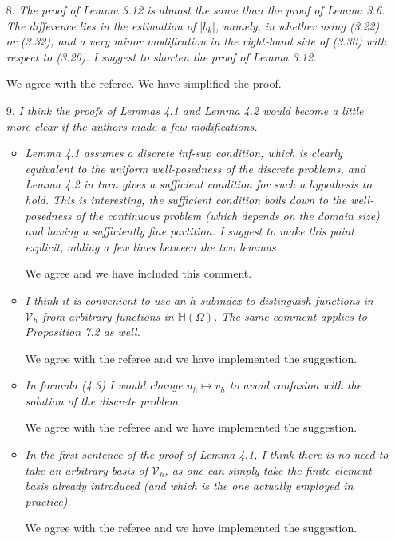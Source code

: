\documentclass[11 pt]{article}
\numberwithin{equation}{section}
\begin{document}
\begin{enumerate}
    \item[8.] \emph{The proof of Lemma 3.12 is almost the same than the proof of Lemma 3.6. The difference lies in the estimation of \(|b_{k}|\), namely, in whether using (3.22) or (3.32), and a very minor modification in the right-hand side of (3.30) with respect to (3.20). I suggest to shorten the proof of Lemma 3.12.}

 We agree with the referee. We have simplified the proof.

    \item[9.] \emph{I think the proofs of Lemmas 4.1 and Lemma 4.2 would become a little more clear if the authors made a few modifications.}
    \begin{itemize}
        \item \emph{Lemma 4.1 assumes a discrete inf-sup condition, which is clearly equivalent to the uniform well-posedness of the discrete problems, and Lemma 4.2 in turn gives a sufficient condition for such a hypothesis to hold. This is interesting, the sufficient condition boils down to the well-posedness of the continuous problem (which depends on the domain size) and having a sufficiently fine partition. I suggest to make this point explicit, adding a few lines between the two lemmas.}

        We agree and we have included this comment.

        \item \emph{I think it is convenient to use an \(h\) subindex to distinguish functions in \({\mathcal{V}}_{h}\) from arbitrary functions in \(\mathbb{H}(\Omega)\). The same comment applies to Proposition 7.2 as well.}

We agree with the referee and we have implemented the suggestion.

        \item \emph{In formula (4.3) I would change \(u_{h}\mapsto v_{h}\) to avoid confusion with the solution of the discrete problem.}

        We agree with the referee and we have implemented the suggestion.

        \item \emph{In the first sentence of the proof of Lemma 4.1, I think there is no need to take an arbitrary basis of \({\mathcal{V}}_{h}\), as one can simply take the finite element basis already introduced (and which is the one actually employed in practice).}

        We agree with the referee and we have implemented the suggestion.


\end{itemize}
\end{enumerate}
\end{document}
